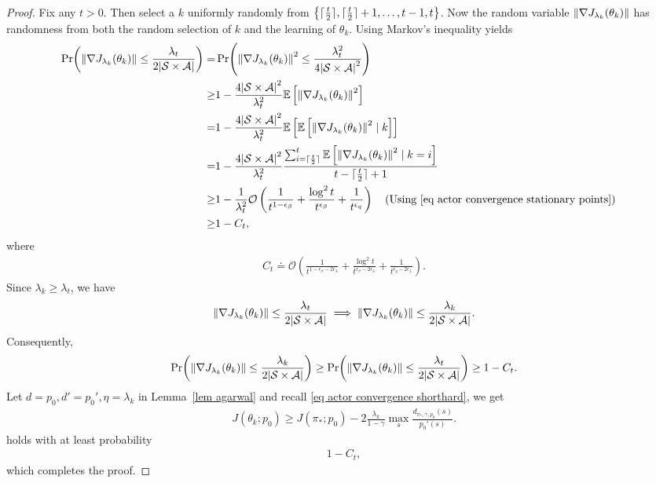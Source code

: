 \documentclass[twoside,11pt]{article}
\DeclarePairedDelimiter{\ceil}{\lceil}{\rceil}
\newcommand{\fS}{\mathcal{S}}
\newcommand{\fA}{\mathcal{A}}
\newcommand{\fO}{\mathcal{O}}
\newcommand{\E}{\mathbb{E}}
\newcommand{\nsa}{{|\fS \times \fA|}}
\numberwithin{assucounter}{section}
\begin{document}
\begin{proof}
Fix any $t > 0$.
Then select a $k$ uniformly randomly from $\qty{\ceil{\frac{t}{2}}, \ceil{\frac{t}{2}} + 1, \dots, t-1, t}$.
Now the random variable $\norm{\nabla J_{\lambda_k}(\theta_k)}$ has randomness from both the random selection of $k$ and the learning of $\theta_k$.
Using Markov's inequality yields
\begin{align}
  \Pr(\norm{\nabla J_{\lambda_k}(\theta_k)} \leq \frac{\lambda_t}{2 \nsa}) =&\Pr(\norm{\nabla J_{\lambda_k}(\theta_k)}^2 \leq \frac{\lambda_t^2}{4 \nsa^2}) \\
  \geq& 1 - \frac{4\nsa^2}{\lambda_t^2} \E\left[\norm{\nabla J_{\lambda_k}(\theta_k)}^2\right] \\
  =& 1 - \frac{4\nsa^2}{\lambda_t^2} \E\left[ \E\left[\norm{\nabla J_{\lambda_k}(\theta_k)}^2 \mid k\right] \right] \\
  =& 1 - \frac{4\nsa^2}{\lambda_t^2} \frac{\sum_{i=\ceil{\frac{t}{2}}}^t \E\left[\norm{ \nabla J_{\lambda_k}(\theta_k)}^2 \mid k =i\right] }{t-\ceil{\frac{t}{2}}+1} \\
  \geq & 1 - \frac{1}{\lambda_t^2}\fO\left(\frac{1}{t^{1-\epsilon_\beta}} + \frac{\log^2 t}{t^{\epsilon_\beta}} + \frac{1}{t^{\epsilon_q }}\right)  \qq{(Using \eqref{eq actor convergence stationary points})} \\
  \geq& 1 - C_t,
\end{align}
where 
\begin{align}
  C_t \doteq \fO\left(\frac{1}{t^{1-\epsilon_\beta - 2\epsilon_\lambda}} + \frac{\log^2 t}{t^{\epsilon_\beta- 2\epsilon_\lambda}} + \frac{1}{t^{\epsilon_q- 2\epsilon_\lambda }}\right).
\end{align}
Since $\lambda_k \geq \lambda_t$,
we have
\begin{align}
  \norm{\nabla J_{\lambda_k}(\theta_k)} \leq \frac{\lambda_t}{2 \nsa} \implies \norm{\nabla J_{\lambda_k}(\theta_k)} \leq \frac{\lambda_k}{2 \nsa}.
\end{align}
Consequently,
\begin{align}
  \Pr(\norm{\nabla J_{\lambda_k}(\theta_k)} \leq \frac{\lambda_k}{2 \nsa}) \geq \Pr(\norm{\nabla J_{\lambda_k}(\theta_k)} \leq \frac{\lambda_t}{2 \nsa}) \geq 1 - C_t.
\end{align}
Let $d=p_0, d' = p_0', \eta = \lambda_k$ in Lemma~\ref{lem agarwal} and recall \eqref{eq actor convergence shorthard},
we get 
\begin{align}
  J(\theta_k; p_0) \geq J(\pi_*; p_0) - 2\frac{\lambda_k}{1 - \gamma} \max_s {\frac{d_{\pi_*, \gamma, p_0}(s)}{p_0'(s)}}.
\end{align}
holds with at least probability
\begin{align}
  1 - C_t,
\end{align}
which completes the proof.

\end{proof} 
\end{document}
